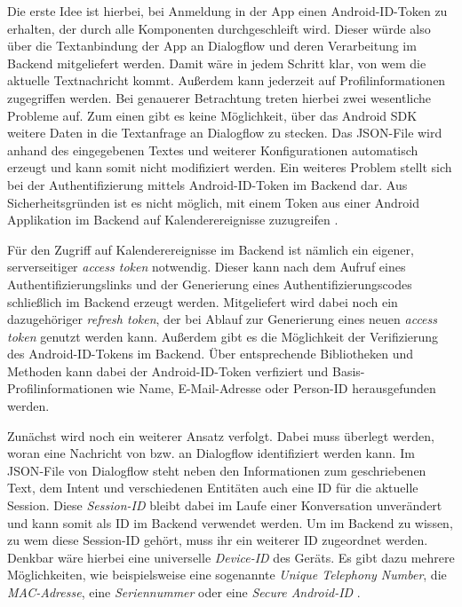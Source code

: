 Die erste Idee ist hierbei, bei Anmeldung in der App einen Android-\ac{ID}-Token zu erhalten, der durch alle Komponenten durchgeschleift wird. Dieser würde also über die Textanbindung der App an Dialogflow und deren Verarbeitung im Backend mitgeliefert werden. Damit wäre in jedem Schritt klar, von wem die aktuelle Textnachricht kommt. Außerdem kann jederzeit auf Profilinformationen zugegriffen werden. Bei genauerer Betrachtung treten hierbei zwei wesentliche Probleme auf. Zum einen gibt es keine Möglichkeit, über das Android \ac{SDK} weitere Daten in die Textanfrage an Dialogflow zu stecken. Das \ac{JSON}-File wird anhand des eingegebenen Textes und weiterer Konfigurationen automatisch erzeugt und kann somit nicht modifiziert werden. Ein weiteres Problem stellt sich bei der Authentifizierung mittels Android-\ac{ID}-Token im Backend dar. Aus Sicherheitsgründen ist es nicht möglich, mit einem Token aus einer Android Applikation im Backend auf Kalenderereignisse zuzugreifen \cite{google_developers_authenticate_2018}. 

Für den Zugriff auf Kalenderereignisse im Backend ist nämlich ein eigener, serverseitiger \textit{access token} notwendig. Dieser kann nach dem Aufruf eines Authentifizierungslinks und der Generierung eines Authentifizierungscodes schließlich im Backend erzeugt werden. Mitgeliefert wird dabei noch ein dazugehöriger \textit{refresh token}, der bei Ablauf zur Generierung eines neuen \textit{access token} genutzt werden kann. Außerdem gibt es die Möglichkeit der Verifizierung des Android-\ac{ID}-Tokens im Backend. Über entsprechende Bibliotheken und Methoden kann dabei der Android-\ac{ID}-Token verfiziert und Basis-Profilinformationen wie Name, E-Mail-Adresse oder Person-\ac{ID} herausgefunden werden. 

Zunächst wird noch ein weiterer Ansatz verfolgt. Dabei muss überlegt werden, woran eine Nachricht von bzw. an Dialogflow identifiziert werden kann. Im \ac{JSON}-File von Dialogflow steht neben den Informationen zum geschriebenen Text, dem Intent und verschiedenen Entitäten auch eine \ac{ID} für die aktuelle Session. Diese \textit{Session-\ac{ID}} bleibt dabei im Laufe einer Konversation unverändert und kann somit als \acl{ID} im Backend verwendet werden. Um im Backend zu wissen, zu wem diese Session-\ac{ID} gehört, muss ihr ein weiterer \acl{ID} zugeordnet werden. Denkbar wäre hierbei eine universelle \textit{Device-\ac{ID}} des Geräts. Es gibt dazu mehrere Möglichkeiten, wie beispielsweise eine sogenannte \textit{Unique Telephony Number}, die \textit{MAC-Adresse}, eine \textit{Seriennummer} oder eine \textit{Secure Android-\ac{ID}} \cite{saurel_s._how_2018}. 

